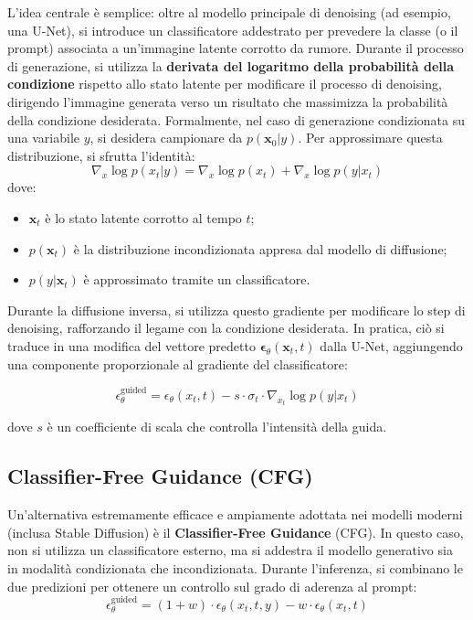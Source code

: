 L'idea centrale è semplice: oltre al modello principale di denoising (ad esempio, una U-Net), si introduce un classificatore addestrato per prevedere la classe (o il prompt) associata a un’immagine latente corrotto da rumore. Durante il processo di generazione, si utilizza la \textbf{derivata del logaritmo della probabilità della condizione} rispetto allo stato latente per modificare il processo di denoising, dirigendo l'immagine generata verso un risultato che massimizza la probabilità della condizione desiderata. Formalmente, nel caso di generazione condizionata su una variabile $y$, si desidera campionare da $p(\mathbf{x}_0 | y)$. Per approssimare questa distribuzione, si sfrutta l'identità:
\begin{equation}
    \nabla_x \log p(x_t|y) = \nabla_x \log p(x_t) + \nabla_x \log p(y|x_t)
\end{equation}
dove:
\begin{itemize}
    \item $\mathbf{x}_t$ è lo stato latente corrotto al tempo $t$;
    \item $p(\mathbf{x}_t)$ è la distribuzione incondizionata appresa dal modello di diffusione;
    \item $p(y | \mathbf{x}_t)$ è approssimato tramite un classificatore.
\end{itemize}

Durante la diffusione inversa, si utilizza questo gradiente per modificare lo step di denoising, rafforzando il legame con la condizione desiderata. In pratica, ciò si traduce in una modifica del vettore predetto $\boldsymbol{\epsilon}_\theta(\mathbf{x}_t, t)$ dalla U-Net, aggiungendo una componente proporzionale al gradiente del classificatore:

\begin{equation}
    \epsilon_\theta^{\operatorname{guided}} = \epsilon_\theta(x_t,t) - s \cdot\sigma_t\cdot\nabla_{x_t}\log p(y|x_t)
\end{equation}

dove $s$ è un coefficiente di scala che controlla l’intensità della guida.

\subsection{Classifier-Free Guidance (CFG)}

Un’alternativa estremamente efficace e ampiamente adottata nei modelli moderni (inclusa Stable Diffusion) è il \textbf{Classifier-Free Guidance} (CFG). In questo caso, non si utilizza un classificatore esterno, ma si addestra il modello generativo sia in modalità condizionata che incondizionata. Durante l'inferenza, si combinano le due predizioni per ottenere un controllo sul grado di aderenza al prompt:
\begin{equation}
    \epsilon_\theta^{\operatorname{guided}} = (1 + w)\cdot\epsilon_\theta(x_t,t,y) - w\cdot\epsilon_\theta(x_t,t)
\end{equation}

